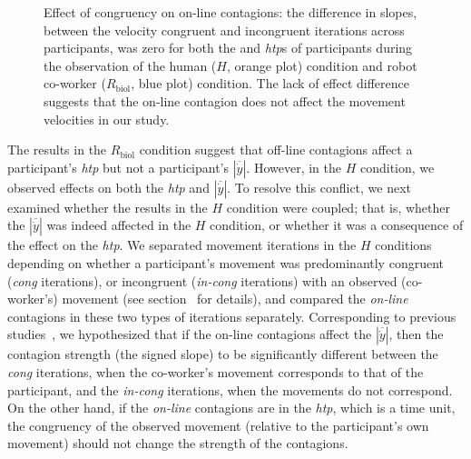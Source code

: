\begin{figure}[t]
	\caption{Effect of congruency on on-line contagions: the difference in slopes, between the velocity congruent and incongruent iterations across participants, was zero for both the  and \textit{htp}s of participants during the observation of the human ($\textit{H}$, orange plot) condition and robot co-worker ($\textit{R}_{\text{biol}}$, blue plot) condition. The lack of effect difference suggests that the on-line contagion does not affect the movement velocities in our study.}
	\label{fig:cong}
\end{figure}

The results in the $R_{\text{biol}}$ condition suggest that off-line contagions affect a participant's {\it htp} but not a participant's $|\overline{\dot{y}}|$. However, in the $H$ condition, we observed effects on both the {\it htp} and $|\overline{\dot{y}}|$. To resolve this conflict, we next examined whether the results in the $H$ condition were coupled; that is, whether the $|\overline{\dot{y}}|$ was indeed affected in the $H$ condition, or whether it was a consequence of the effect on the {\it htp}. We separated movement iterations in the $H$ conditions depending on whether a participant's movement was predominantly congruent ({\it cong} iterations), or incongruent ({\it in-cong} iterations) with an observed (co-worker's) movement (see section~ for details), and compared the {\it on-line} contagions in these two types of iterations separately. Corresponding to previous studies~\cite{Noy:B&C:2009, Kilner:SocialNeuro:2007, Bisio:PlosOne:2010}, we hypothesized that if the on-line contagions affect the $|\overline{\dot{y}}|$, then the contagion strength (the signed slope) to be significantly different between the {\it cong} iterations, when the co-worker's movement corresponds to that of the participant, and the {\it in-cong} iterations, when the movements do not correspond. On the other hand, if the {\it on-line} contagions are in the {\it htp}, which is a time unit, the congruency of the observed movement (relative to the participant's own movement) should not change the strength of the contagions.

